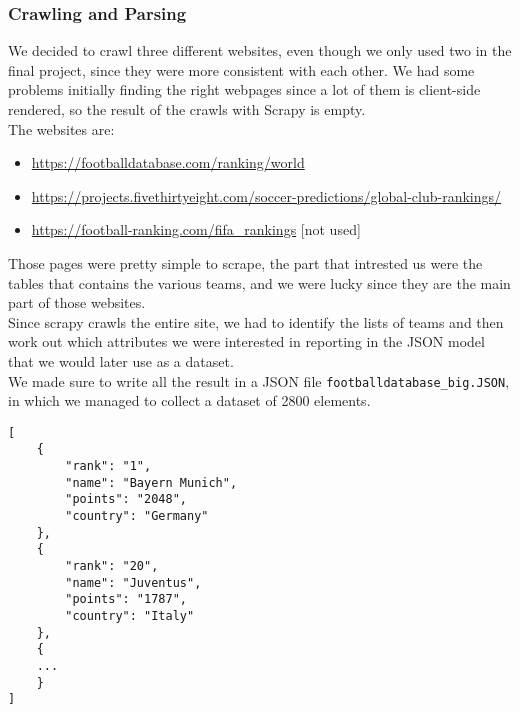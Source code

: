 \documentclass{article}
\begin{document}
\subsubsection{Crawling and Parsing}
We decided to crawl three different websites, even though we only used two in the final project, since they were more consistent with each other. We had some problems initially finding the right webpages since a lot of them is client-side rendered, so the result of the crawls with Scrapy is empty. \\
The websites are:
\begin{itemize}
    \item \url{https://footballdatabase.com/ranking/world}
    \item \url{https://projects.fivethirtyeight.com/soccer-predictions/global-club-rankings/}
    \item \url{https://football-ranking.com/fifa_rankings} [not used]
\end{itemize}
Those pages were pretty simple to scrape, the part that intrested us were the tables that contains the various teams, and we were lucky since they are the main part of those websites.\\
Since scrapy crawls the entire site, we had to identify the lists of teams and then work out which attributes we were interested in reporting in the JSON model that we would later use as a dataset.\\ We made sure to write all the result in a JSON file \texttt{footballdatabase\_big.JSON}, in which we managed to collect a dataset of 2800 elements.\\
\begin{lstlisting}[caption={Snippet of the JSON model}, captionpos=b]
[
    { 
        "rank": "1",
        "name": "Bayern Munich",
        "points": "2048",
        "country": "Germany"
    },
    { 
        "rank": "20",
        "name": "Juventus",
        "points": "1787",
        "country": "Italy"
    },
    {
    ...
    }
]
\end{lstlisting}
\end{document}
